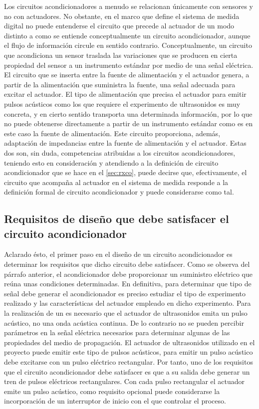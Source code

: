 Los circuitos acondicionadores a menudo se relacionan únicamente con
sensores y no con actuadores. No obstante, en el marco que define el
sistema de medida digital no puede entenderse el circuito que precede al
actuador de un modo distinto a como se entiende conceptualmente un circuito
acondicionador, aunque el flujo de información circule en sentido
contrario. Conceptualmente, un circuito que acondiciona un sensor traslada
las variaciones que se producen en cierta propiedad del sensor a un
instrumento estándar por medio de una señal eléctrica. El circuito que se
inserta entre la fuente de alimentación y el actuador genera, a partir de
la alimentación que suministra la fuente, una señal adecuada para excitar
el actuador. El tipo de alimentación que precisa el actuador para emitir
pulsos acústicos como los que requiere el experimento de ultrasonidos es
muy concreta, y en cierto sentido transporta una determinada información,
por lo que no puede obtenerse directamente a partir de un instrumento
estándar como es en este caso la fuente de alimentación. Este circuito
proporciona, además, adaptación de impedancias entre la fuente de
alimentación y el actuador. Estas dos son, sin duda, competencias
atribuidas a los circuitos acondicionadores, teniendo esto en consideración
y atendiendo a la definición de circuito acondicionador que se hace en el
\cref{sec:rxco}, puede decirse que, efectivamente, el circuito que acompaña
al actuador en el sistema de medida responde a la definición formal de
circuito acondicionador y puede considerarse como tal.


\subsection[Requisitos de diseño del acondicionador]{Requisitos de diseño
que debe satisfacer el circuito acondicionador}

Aclarado ésto, el primer paso en el diseño de un circuito acondicionador es
determinar los requisitos que dicho circuito debe satisfacer. Como se
observa del párrafo anterior, el acondicionador debe proporcionar un
suministro eléctrico que reúna unas condiciones determinadas. En
definitiva, para determinar que tipo de señal debe generar el
acondicionador es preciso estudiar el tipo de experimento realizado y las
características del actuador empleado en dicho experimento. Para la
realización de un  es necesario que el actuador de ultrasonidos
emita un pulso acústico, no una onda acústica continua. De lo contrario no
se pueden percibir parámetros en la señal eléctrica necesarios para
determinar algunas de las propiedades del medio de propagación. El actuador
de ultrasonidos utilizado en el proyecto puede emitir este tipo de pulsos
acústicos, para emitir un pulso acústico debe excitarse con un pulso
eléctrico rectangular. Por tanto, uno de los requisitos que el circuito
acondicionador debe satisfacer es que a su salida debe generar un tren de
pulsos eléctricos rectangulares. Con cada pulso rectangular el actuador
emite un pulso acústico, como requisito opcional puede considerarse la
incorporación de un interruptor de inicio con el que controlar el proceso.


